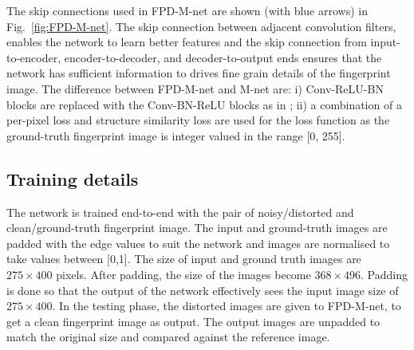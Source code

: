 \documentclass{llncs}
\begin{document}
The skip connections used in FPD-M-net are shown (with blue arrows) in Fig.~\ref{fig:FPD-M-net}. The skip connection between adjacent convolution filters, enables the network to learn better features \cite{srivastava2015highway} and the skip connection from input-to-encoder, encoder-to-decoder, and decoder-to-output ends ensures that the network has sufficient information to drives fine grain details of the fingerprint image. The difference between FPD-M-net and M-net are: i) Conv-ReLU-BN blocks are replaced with the Conv-BN-ReLU blocks as in \cite{ioffe2015batch}; ii) a combination of a per-pixel loss and structure similarity loss are used for the loss function as the ground-truth fingerprint image is integer valued in the range [0, 255].

\subsection{Training details}
\label{ssec:training}
The network is trained end-to-end with the pair of noisy/distorted and clean/ground-truth fingerprint image. The input and ground-truth images are padded with the edge values to suit the network and images are normalised to take values between [0,1]. The size of input and ground truth images are $275 \times 400$ pixels. After padding, the size of the images become $368 \times 496$. Padding is done so that the output of the network effectively sees the input image size of $275 \times 400$. In the testing phase, the distorted images are given to FPD-M-net, to get a clean fingerprint image as output. The output images are unpadded to match the original size and compared against the reference image.
\end{document}
